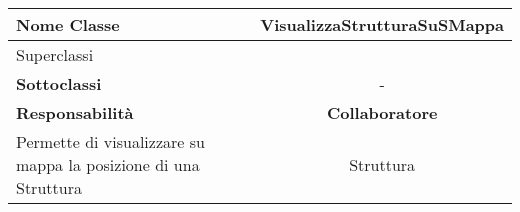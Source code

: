 
\setcounter{table}{0}
\begin{table}[H]
    \centering
    \begin{tabularx}{\textwidth}{||   X  ||  c   ||}
        \hline
        \rowcolor{Gray}
        \textbf{Nome Classe} & VisualizzaStrutturaSuSMappa\\
        \hline
        Superclassi  &   \\
        \hline
        \textbf{Sottoclassi} & - \\
        \hline
         \textbf{Responsabilità} & \textbf{Collaboratore} \\
         \hline
          Permette di visualizzare su mappa la posizione di una Struttura & Struttura \\
         \hline
    \end{tabularx}
\end{table}
